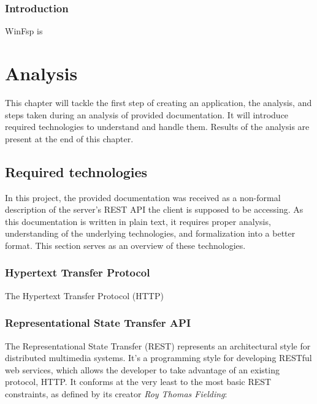 \newpage
\subsection{Introduction}
WinFsp is

\chapter{Analysis}
\label{ch_analysis}
This chapter will tackle the first step of creating an application, the analysis, and steps taken during an analysis of provided documentation. It will introduce required technologies to understand and handle them. Results of the analysis are present at the end of this chapter.


\section{Required technologies}
In this project, the provided documentation was received as a non-formal description of the server's REST API the client is supposed to be accessing. As this documentation is written in plain text, it requires proper analysis, understanding of the underlying technologies, and formalization into a better format. This section serves as an overview of these technologies.

\subsection{Hypertext Transfer Protocol}
The Hypertext Transfer Protocol (HTTP) 

\cite{MozillaHTTP}

\subsection{Representational State Transfer API}
The Representational State Transfer (REST) represents an architectural style for distributed multimedia systems. It's a programming style for developing RESTful web services, which allows the developer to take advantage of an existing protocol, HTTP. It conforms at the very least to the most basic REST constraints, as defined by its creator \textit{Roy Thomas Fielding}:

